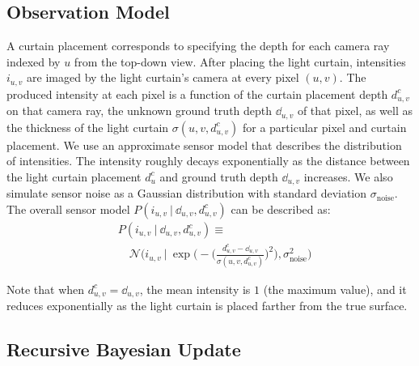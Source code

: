 \subsection{Observation Model}

A curtain placement corresponds to specifying the depth for each camera ray indexed by $u$ from the top-down view. After placing the light curtain, intensities $i_{u,v}$ are imaged by the light curtain's camera at every pixel $(u, v)$. The produced intensity at each pixel is a function of the curtain placement depth $d^c_{u, v}$ on that camera ray, the unknown ground truth depth $\dd_{u, v}$ of that pixel, as well as the thickness of the light curtain $\sigma(u, v, d^c_{u, v})$ for a particular pixel and curtain placement. We use an approximate sensor model that describes the distribution of intensities. The intensity roughly decays exponentially as the distance between the light curtain placement $d^c_u$ and ground truth depth $\dd_{u, v}$ increases.  We also simulate sensor noise as a Gaussian distribution with standard deviation $\sigma_\text{noise}$. The overall sensor model $P(i_{u, v}\ |\ \dd_{u, v}, d^c_{u, v})$ can be described as:
\begin{align}
   &\nonumber P(i_{u, v}\ |\ \dd_{u, v}, d^c_{u, v}) \equiv\\
   &\quad \mathcal{N} \Big(i_{u, v}\ |\ \exp \Big(-\Bigg(\frac{d^c_{u, v} - \dd_{u, v}}{\sigma(u, v, d^c_{u, v})}\Bigg)^2\Big), \sigma_\text{noise}^2\Big)
   \label{eqn:sensor_model}
\end{align}

Note that when $d^c_{u, v} = \dd_{u, v}$, the mean intensity is $1$ (the maximum value), and it reduces exponentially as the light curtain is placed farther from the true surface.

\subsection{Recursive Bayesian Update}
\newcommand{\qb}{q'}
\newcommand{\before}[1]{{P_\text{prev}(u, v, #1)}}
\newcommand{\after}[1]{{P_\text{next}(u, v, #1)}}


